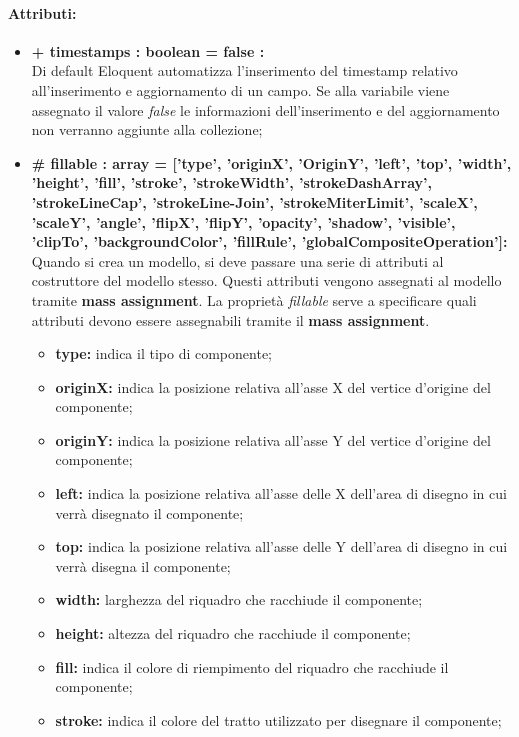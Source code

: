 	\paragraph{Attributi:}
	\begin{itemize}
		\item \textbf{+ timestamps : boolean = false :}\\
		Di default Eloquent automatizza l'inserimento del timestamp relativo all'inserimento e aggiornamento di un campo. Se alla variabile viene assegnato il valore \textit{false} le informazioni dell'inserimento e del aggiornamento non verranno aggiunte alla collezione;
		\item \textbf{\# fillable : array = [’type’, ’originX’, ’OriginY’, ’left’, ’top’, ’width’, ’height’, ’fill’, ’stroke’, ’strokeWidth’, ’strokeDashArray’, ’strokeLineCap’, ’strokeLine-Join’, ’strokeMiterLimit’, ’scaleX’, ’scaleY’, ’angle’, ’flipX’, ’flipY’, ’opacity’, ’shadow’, ’visible’, ’clipTo’, ’backgroundColor’, ’fillRule’, ’globalCompositeOperation']:}\\
		Quando si crea un modello, si deve passare una serie di attributi al costruttore del modello stesso. Questi attributi vengono assegnati al modello tramite \textbf{mass assignment}. La proprietà \textit{fillable} serve a specificare quali attributi devono essere assegnabili tramite il \textbf{mass assignment}.
		\begin{itemize}
			\item \textbf{type:} indica il tipo di componente;
			\item \textbf{originX:} indica la posizione relativa all'asse X del vertice d'origine del componente;
			\item \textbf{originY:} indica la posizione relativa all'asse Y del vertice d'origine del componente;
			\item \textbf{left:} indica la posizione relativa all'asse delle X dell'area di disegno in cui verrà disegnato il componente;
			\item \textbf{top:} indica la posizione relativa all'asse delle Y dell'area di disegno in cui verrà disegna il componente;
			\item \textbf{width:} larghezza del riquadro che racchiude il componente;
			\item \textbf{height:} altezza del riquadro che racchiude il componente;
			\item \textbf{fill:} indica il colore di riempimento del riquadro che racchiude il componente;
			\item \textbf{stroke:} indica il colore del tratto utilizzato per disegnare il componente;

\end{itemize}
\end{itemize}
